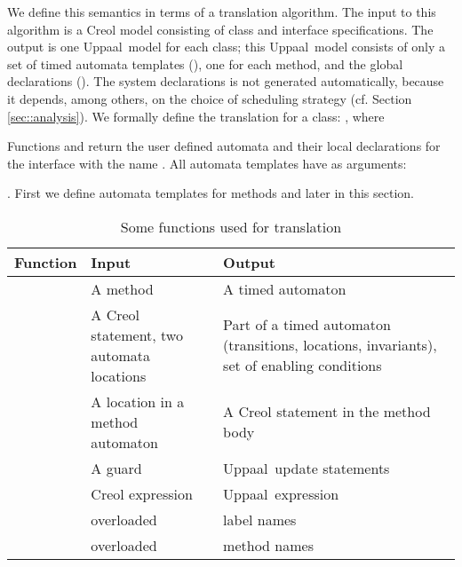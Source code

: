 \documentclass[copyright,creativecommons]{eptcs}
\theoremstyle{definition}
\newcommand{\Uppaal}{{\sc Uppaal}\xspace}
\begin{document}
We define this semantics in terms of a translation algorithm.
The input to this algorithm is a Creol model consisting of class and interface specifications.
The output is one \Uppaal\ model for each class; this \Uppaal\ model consists of only a set of timed automata templates (), one for each method, and the global declarations ().
The system declarations is not generated automatically, because it depends, among others, on the choice of scheduling strategy (cf. Section \ref {sec::analysis}).
We formally define the translation for a class: , where
{\small

}
Functions  and  return the user defined automata and their local declarations for the interface with the name .
All automata templates have as arguments:
{\small

}.
First we define automata templates for methods and later  in this section.


\begin{table}
{\small
\begin{tabular}{@{}p{.19\linewidth}|p{.33\linewidth}|p{.40\linewidth}}
Function & Input & Output \\ \hline
 & A method & A timed automaton \\ \hline
 &   A  Creol statement, two automata locations &
Part of a timed automaton (transitions, locations, invariants), set of enabling conditions \\\hline
&  A location in a method automaton & A Creol statement in the method body \\\hline
 & A guard & \Uppaal\ update statements\\\hline
 & Creol expression & \Uppaal\ expression\\ \hline
 & overloaded & label names \\ \hline
 & overloaded & method names  \\
\end{tabular}
}
\caption{Some functions used for translation}
\label{tab:function}
\end{table}
\end{document}
